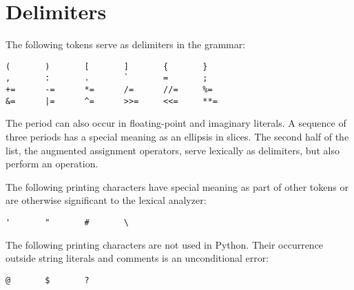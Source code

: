 \section{Delimiters\label{delimiters}}

The following tokens serve as delimiters in the grammar:

\begin{verbatim}
(       )       [       ]       {       }
,       :       .       `       =       ;
+=      -=      *=      /=      //=     %=
&=      |=      ^=      >>=     <<=     **=
\end{verbatim}

The period can also occur in floating-point and imaginary literals.  A
sequence of three periods has a special meaning as an ellipsis in slices.
The second half of the list, the augmented assignment operators, serve
lexically as delimiters, but also perform an operation.

The following printing \ASCII{} characters have special meaning as part
of other tokens or are otherwise significant to the lexical analyzer:

\begin{verbatim}
'       "       #       \
\end{verbatim}

The following printing \ASCII{} characters are not used in Python.  Their
occurrence outside string literals and comments is an unconditional
error:

\begin{verbatim}
@       $       ?
\end{verbatim}
